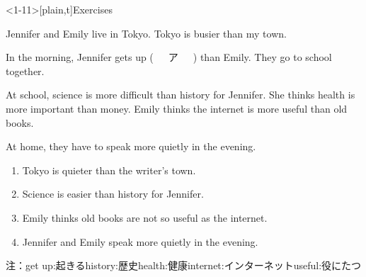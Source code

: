 \documentclass[aspectratio=169,xcolor={dvipsnames,table}]{beamer}
\begin{document}
\begin{frame}<1-11>[plain,t]{Exercises}
\scriptsize

\vspace{-3pt}
\small
\begin{tcolorbox}[colframe=ForestGreen,
  colback=ForestGreen!10!white,
  colbacktitle=ForestGreen!40!white,
  coltitle=black, %
  before upper={\setlength{\parindent}{1.25em}},
  title=次の英文を読み、あとの設問に答えましょう\mbox{}\hfill{\tiny 0022}\,{\scriptsize \myaudio{./audio/044_more_most_08.mp3},08}
]
Jennifer and Emily live in Tokyo.
Tokyo is busier than my town.

In the morning, Jennifer gets up (~~~ア~~~) than Emily.
They go to school together.

At school, science is more difficult than history for Jennifer.
She thinks health is more important than money.
Emily thinks the internet is more useful than old books.

At home, they have to speak more quietly in the evening.

\end{tcolorbox}

\vspace{-2pt}
\vspace{-5pt}
\begin{enumerate}\scriptsize\setlength{\itemsep}{-2pt}
 \item<2-> Tokyo is quieter than the writer's town.\hfill{}
 \item<2-> Science is easier than history for Jennifer.\hfill{}
 \item<2-> Emily thinks old books are not so useful as the internet.\hfill{}
 \item<2-> Jennifer and Emily speak more quietly in the evening.\hfill{}
\end{enumerate}

\vspace*{-7pt}

%
\hfill{}

\vspace{3pt}

{\scriptsize 注：\hspace{5pt}get up:起きる\hspace{12pt}history:歴史\hspace{12pt}health:健康\hspace{12pt}internet:インターネット\hspace{12pt}useful:役にたつ}


\end{frame}
\end{document}
